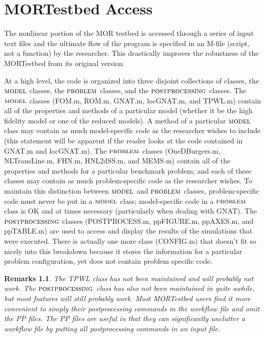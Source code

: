 \documentclass[notitlepage]{report}
\newtheorem*{Rem}{Remarks}
\newcommand{\model}{\ensuremath{\textsc{model }}}
\newcommand{\problem}{\ensuremath{\textsc{problem }}}
\newcommand{\post}{\ensuremath{\textsc{postprocessing }}}
\begin{document}


\chapter{MORTestbed Access}\label{ch:access}
The nonlinear portion of the MOR testbed is accessed through a series of input text files and the ultimate flow of the program is specified in an M-file (script, not a function) by the researcher.  This drastically improves the robustness of the MORTestbed from its original version.

At a high level, the code is organized into three disjoint collections of classes, the \model classes, the \problem classes, and the \post classes.  The \model classes (FOM.m, ROM.m, GNAT.m, locGNAT.m, and TPWL.m) contain all of the properties and methods of a particular model (whether it be the high fidelity model or one of the reduced models).  A method of a particular \model class may contain as much model-specific code as the researcher wishes to include (this statement will be apparent if the reader looks at the code contained in GNAT.m and locGNAT.m).  The \problem classes (OneDBurgers.m, NLTransLine.m, FHN.m, HNL2dSS.m, and MEMS.m) contain all of the properties and methods for a particular benchmark problem; and each of these classes may contain as much problem-specific code as the researcher wishes.  To maintain this distinction between \model and \problem classes, problem-specific code must never be put in a \model class; model-specific code in a \problem class is OK and at times necessary (particularly when dealing with GNAT).  The \post classes (POSTPROCESS.m, ppFIGURE.m, ppAXES.m, and ppTABLE.m) are used to access and display the results of the simulations that were executed.  There is actually one more class (CONFIG.m) that doesn't fit so nicely into this breakdown because it stores the information for a particular problem configuration, yet does not contain problem specific code.

\begin{Rem}
  The TPWL class has not been maintained and will probably not work.  The \post class has also not been maintained in quite awhile, but most features will still probably work.  Most MORTestbed users find it more convenient to simply their postprocessing commands in the workflow file and omit the PP files.  The PP files are useful in that they can significantly unclutter a workflow file by putting all postprocessing commands in an input file.
\end{Rem}
\end{document}
